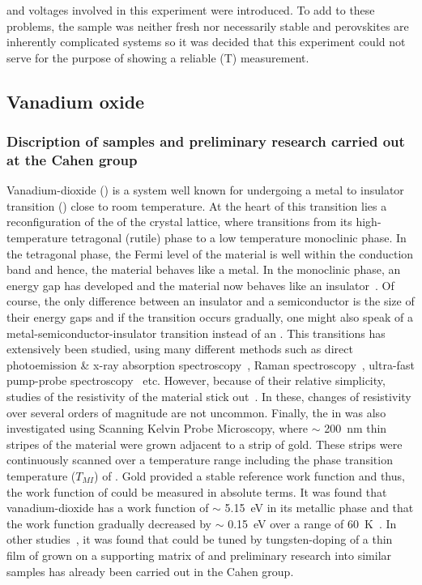 and voltages involved in this experiment were introduced. To add to these problems, the sample was neither fresh nor necessarily stable and perovskites are inherently complicated systems so it was decided that this experiment could not serve for the purpose of showing a reliable \spv{}(T) measurement.\\

\subsection{Vanadium oxide}
\subsubsection{Discription of samples and preliminary research carried out at the Cahen group}
Vanadium-dioxide (\vadiox{}) is a system well known for undergoing a metal to insulator transition (\mit{}) close to room temperature. At the heart of this transition lies a reconfiguration of the of the crystal lattice, where \vadiox{} transitions from its high-temperature tetragonal (rutile) phase to a low temperature monoclinic phase. In the tetragonal phase, the Fermi level of the material is well within the conduction band and hence, the material behaves like a metal. In the monoclinic phase, an energy gap has developed and the material now behaves like an insulator~\cite{nakano_gapopen}. Of course, the only difference between an insulator and a semiconductor is the size of their energy gaps and if the transition occurs gradually, one might also speak of a metal-semiconductor-insulator transition instead of an \mit{}. This transitions has extensively been studied, using many different methods such as direct photoemission \& x-ray absorption spectroscopy~\cite{koethe_expstud}, Raman spectroscopy~\cite{radue_raman}, ultra-fast pump-probe spectroscopy~\cite{jensen_expgap} etc. However, because of their relative simplicity, studies of the resistivity of the material stick out~\cite{shibuya_physlet}. In these, changes of resistivity over several orders of magnitude are not uncommon. Finally, the \mit{} in \vadiox{} was also investigated using Scanning Kelvin Probe Microscopy, where $\sim$ \SI{200}{\nano\metre} thin stripes of the material were grown adjacent to a strip of gold. These strips were continuously scanned over a temperature range including the phase transition temperature ($T_{MI}$) of \vadiox{}. Gold provided a stable reference work function and thus, the work function of \vadiox{} could be measured in absolute terms. It was found that vanadium-dioxide has a work function of $\sim$ \SI{5.15}{\electronvolt} in its metallic phase and that the work function gradually decreased by $\sim$ \SI{0.15}{\electronvolt} over a range of \SI{60}{\kelvin}~\cite{ko_kp}. In other studies~\cite{shibuya_physrev}, it was found that \mit{} could be tuned by tungsten-doping of a thin film of \vadiox{} grown on a supporting matrix of \tiox{} and preliminary research into similar samples has already been carried out in the Cahen group.\\
